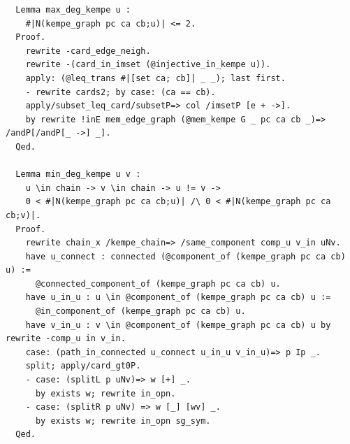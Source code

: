 \begin{verbatim}
  Lemma max_deg_kempe u : 
    #|N(kempe_graph pc ca cb;u)| <= 2.
  Proof.
    rewrite -card_edge_neigh.
    rewrite -(card_in_imset (@injective_in_kempe u)).
    apply: (@leq_trans #|[set ca; cb]| _ _); last first.
    - rewrite cards2; by case: (ca == cb).
    apply/subset_leq_card/subsetP=> col /imsetP [e + ->].
    by rewrite !inE mem_edge_graph (@mem_kempe G _ pc ca cb _)=> /andP[/andP[_ ->] _].
  Qed.

  Lemma min_deg_kempe u v :
    u \in chain -> v \in chain -> u != v ->
    0 < #|N(kempe_graph pc ca cb;u)| /\ 0 < #|N(kempe_graph pc ca cb;v)|.
  Proof.
    rewrite chain_x /kempe_chain=> /same_component comp_u v_in uNv.
    have u_connect : connected (@component_of (kempe_graph pc ca cb) u) := 
      @connected_component_of (kempe_graph pc ca cb) u.
    have u_in_u : u \in @component_of (kempe_graph pc ca cb) u :=
      @in_component_of (kempe_graph pc ca cb) u.
    have v_in_u : v \in @component_of (kempe_graph pc ca cb) u by rewrite -comp_u in v_in.
    case: (path_in_connected u_connect u_in_u v_in_u)=> p Ip _.
    split; apply/card_gt0P.
    - case: (splitL p uNv)=> w [+] _.
      by exists w; rewrite in_opn.
    - case: (splitR p uNv) => w [_] [wv] _.
      by exists w; rewrite in_opn sg_sym.
  Qed.


\end{verbatim}
